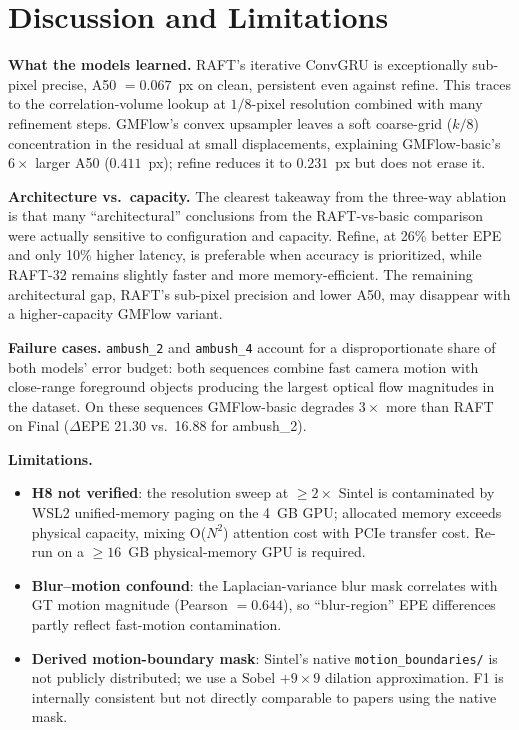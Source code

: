 \documentclass[11pt,a4paper]{article}
\let\origsection\section
\renewcommand{\section}{\FloatBarrier\origsection}
\begin{document}
\section{Discussion and Limitations}

\textbf{What the models learned.}
RAFT's iterative ConvGRU is exceptionally sub-pixel precise, A50
$= 0.067$~px on clean, persistent even against refine.  This traces to
the correlation-volume lookup at $1/8$-pixel resolution combined with
many refinement steps.  GMFlow's convex upsampler leaves a soft
coarse-grid ($k/8$) concentration in the residual at small displacements,
explaining GMFlow-basic's $6\times$ larger A50 ($0.411$~px); refine
reduces it to $0.231$~px but does not erase it.

\textbf{Architecture vs.\ capacity.}
The clearest takeaway from the three-way ablation is that many
``architectural'' conclusions from the RAFT-vs-basic comparison were
actually sensitive to configuration and capacity.  Refine, at 26\% better
EPE and only 10\% higher latency, is preferable when accuracy is prioritized,
while RAFT-32 remains slightly faster and more memory-efficient.  The
remaining architectural gap, RAFT's
sub-pixel precision and lower A50, may disappear with a higher-capacity
GMFlow variant.

\textbf{Failure cases.}
\texttt{ambush\_2} and \texttt{ambush\_4} account for a disproportionate
share of both models' error budget: both sequences combine fast camera
motion with close-range foreground objects producing the largest optical
flow magnitudes in the dataset.  On these sequences GMFlow-basic
degrades $3\times$ more than RAFT on Final ($\Delta$EPE 21.30 vs.\ 16.88
for ambush\_2).

\textbf{Limitations.}
\begin{itemize}[leftmargin=1.4em,topsep=2pt,itemsep=1pt]
  \item \textbf{H8 not verified}: the resolution sweep at $\geq2\times$
    Sintel is contaminated by WSL2 unified-memory paging on the 4~GB
    GPU; allocated memory exceeds physical capacity, mixing O($N^2$)
    attention cost with PCIe transfer cost.  Re-run on a $\geq16$~GB
    physical-memory GPU is required.
  \item \textbf{Blur–motion confound}: the Laplacian-variance blur mask
    correlates with GT motion magnitude (Pearson $= 0.644$), so
    ``blur-region'' EPE differences partly reflect fast-motion
    contamination.
  \item \textbf{Derived motion-boundary mask}: Sintel's native
    \texttt{motion\_boundaries/} is not publicly distributed; we use a
    Sobel $+ 9{\times}9$ dilation approximation.  F1 is internally
    consistent but not directly comparable to papers using the native mask.
\end{itemize}
\end{document}

